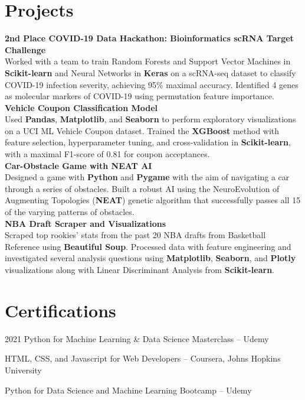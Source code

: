 \documentclass[a4paper,20pt]{article}
\begin{document}
\section{Projects}
\normalsize \textbf{2nd Place COVID-19 Data Hackathon: Bioinformatics scRNA Target Challenge}\\
Worked with a team to train Random Forests and Support Vector Machines in \textbf{Scikit-learn} and Neural Networks in \textbf{Keras} on a scRNA-seq dataset to classify COVID-19 infection severity, achieving 95\% maximal accuracy. Identified 4 genes as molecular markers of COVID-19 using permutation feature importance.\\
\vspace{5pt}
\normalsize \textbf{Vehicle Coupon Classification Model}\\
Used \textbf{Pandas}, \textbf{Matplotlib}, and \textbf{Seaborn} to perform exploratory visualizations on a UCI ML Vehicle Coupon dataset. Trained the \textbf{XGBoost} method with feature selection, hyperparameter tuning, and cross-validation in \textbf{Scikit-learn}, with a maximal F1-score of 0.81 for coupon acceptances.\\
\vspace{5pt}
\normalsize \textbf{Car-Obstacle Game with NEAT AI}\\
Designed a game with \textbf{Python} and \textbf{Pygame} with the aim of navigating a car through a series of obstacles. Built a robust AI using the NeuroEvolution of Augmenting Topologies (\textbf{NEAT}) genetic algorithm that successfully passes all 15 of the varying patterns of obstacles.\\
\vspace{5pt}
\normalsize \textbf{NBA Draft Scraper and Visualizations}\\
Scraped top rookies’ stats from the past 20 NBA drafts from Basketball Reference using \textbf{Beautiful Soup}. Processed data with feature engineering and investigated several analysis questions using \textbf{Matplotlib}, \textbf{Seaborn}, and \textbf{Plotly} visualizations along with Linear Discriminant Analysis from \textbf{Scikit-learn}.\\
\vspace{5pt}
\vspace{-5pt}
\section{Certifications}
\begin{description}[font=$\bullet$]
\item {2021 Python for Machine Learning \& Data Science Masterclass – Udemy}
\vspace{-5pt}
\item {HTML, CSS, and Javascript for Web Developers – Coursera, Johns Hopkins University}
\vspace{-5pt}
\item {Python for Data Science and Machine Learning Bootcamp – Udemy}

\end{description}
\end{document}
